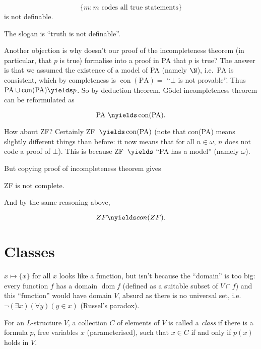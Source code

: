 \documentclass[a4paper]{article}
\DeclareMathOperator{\dom}{dom}%
\begin{document}
\begin{theorem}
  \[
    \{m: m \text{ codes all true statements}\}
  \]
  is not definable.
\end{theorem}

The slogan is ``truth is not definable''.

Another objection is why doesn't our proof of the incompleteness theorem (in particular, that \(p\) is true) formalise into a proof in PA that \(p\) is true? The answer is that we assumed the existence of a model of PA (namely \(\N\)), i.e.\ PA is consistent, which by completeness is \(\operatorname{con}(\text{PA}) = \) ``\(\bot\) is not provable''. Thus \(\text{PA} \cup \operatorname{con}(\text{PA}) \yields p\). So by deduction theorem, Gödel incompleteness theorem can be reformulated as

\begin{theorem}
  \[
    \text{PA }\nyields \operatorname{con}(\text{PA}).
  \]
\end{theorem}

How about ZF? Certainly ZF~\(\yields \operatorname{con}(\text{PA})\) (note that con(PA) means slightly different things than before: it now means that for all \(n \in \omega\), \(n\) does not code a proof of \(\bot\)). This is because ZF~\(\yields\) ``PA has a model'' (namely \(\omega\)).

But copying proof of incompleteness theorem gives

\begin{theorem}
  ZF is not complete.
\end{theorem}

And by the same reasoning above,

\begin{theorem}
  \[
    ZF \nyields con(ZF).
  \]
\end{theorem}

\appendix

\section{Classes}
\label{sec:classes}

\(x \mapsto \{x\}\) for all \(x\) looks like a function, but isn't because the ``domain'' is too big: every function \(f\) has a domain \(\dom f\) (defined as a suitable subset of \(V \cap f\)) and this ``function'' would have domain \(V\), absurd as there is no universal set, i.e.\ \(\neg (\exists x) (\forall y) (y \in x)\) (Russel's paradox).

\begin{definition}[Class]
  For an \(L\)-structure \(V\), a collection \(C\) of elements of \(V\) is called a \emph{class} if there is a formula \(p\), free variables \(x\) (parameterised), such that \(x \in C\) if and only if \(p(x)\) holds in \(V\).
\end{definition}
\end{document}
